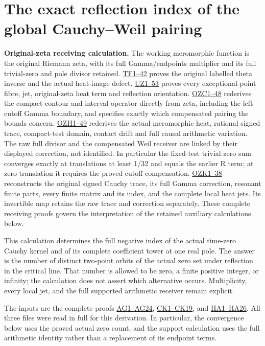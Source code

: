 \documentclass[
  10pt,
  a4paper,
]{article}
\author{}
\date{}
\begin{document}
{
\setcounter{tocdepth}{3}
\tableofcontents
}
\section{The exact reflection index of the global Cauchy--Weil
pairing}\label{the-exact-reflection-index-of-the-global-cauchyweil-pairing}

\textbf{Original-zeta receiving calculation.} The working meromorphic
function is the original Riemann zeta, with its full Gamma/endpoints
multiplier and its full trivial-zero and pole divisor retained.
\href{FAITHFUL_THETA_COMPLETION_RETURN.md}{TF1--42} proves the original
labelled theta inverse and the actual heat-image defect.
\href{FAITHFUL_UNCOMPLETED_ZETA_HEAT.md}{UZ1--53} proves every
exceptional-point fibre, jet, original-zeta heat term and reflection
orientation.
\href{ORIGINAL_ZETA_COMPACT_WEIL_RECONSTRUCTION.md}{OZC1--48} rederives
the compact contour and interval operator directly from zeta, including
the left-cutoff Gamma boundary, and specifies exactly which compensated
pairing the bounds concern.
\href{ORIGINAL_ZETA_HEAT_CONTACT_RECONSTRUCTION.md}{OZH1--49} rederives
the actual meromorphic heat, rational signed trace, compact-test domain,
contact drift and full causal arithmetic variation. The raw full divisor
and the compensated Weil receiver are linked by their displayed
correction, not identified. In particular the fixed-test trivial-zero
sum converges exactly at translations at least 1/32 and equals the
earlier R term; at zero translation it requires the proved cutoff
compensation. \href{ORIGINAL_ZETA_CAUCHY_RECONSTRUCTION.md}{OZK1--38}
reconstructs the original signed Cauchy trace, its full Gamma
correction, resonant finite parts, every finite matrix and its index,
and the complete local heat jets. Its invertible map retains the raw
trace and correction separately. These complete receiving proofs govern
the interpretation of the retained auxiliary calculations below.

This calculation determines the full negative index of the actual
time-zero Cauchy kernel and of its complete coefficient tower at one
real pole. The answer is the number of distinct two-point orbits of the
actual zero set under reflection in the critical line. That number is
allowed to be zero, a finite positive integer, or infinity; the
calculation does not assert which alternative occurs. Multiplicity,
every local jet, and the full supported arithmetic receiver remain
explicit.

The inputs are the complete proofs
\href{ACTUAL_HEAT_ZERO_DISTRIBUTION_VARIATION.md}{AG1--AG24},
\href{CAUCHY_WEIL_POSITIVITY_CRITERION.md}{CK1--CK19}, and
\href{HEAT_CAUCHY_ARITHMETIC_DERIVATION.md}{HA1--HA26}. All three files
were read in full for this derivation. In particular, the convergence
below uses the proved actual zero count, and the support calculation
uses the full arithmetic identity rather than a replacement of its
endpoint terms.
\end{document}
